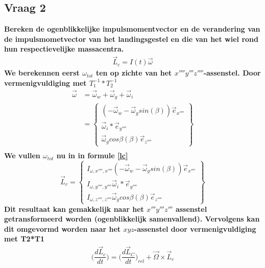 \documentclass[a4paper,10pt]{article}
\begin{document}
\subsection{Vraag 2}
\textbf{Bereken de ogenblikkelijke impulsmomentvector en de verandering van de impulsmometvector van het landingsgestel en die van het wiel rond hun respectievelijke massacentra.}
\begin{equation}
\label{lc}
\begin{aligned}
	\vec{L}_c = I(t)\vec{\omega}
\end{aligned}
\end{equation}
\textbf{We berekennen eerst $\omega_{tot}$ ten op zichte van het $x''''y'''z''''$-assenstel. Door vermenigvuldiging met $T_1^{-1}*T_2^{-1}$}
\begin{equation}
\begin{aligned}
\vec{\omega} &= \vec{\omega}_w + \vec{\omega}_g + \vec{\omega}_i\\
&= \begin{Bmatrix}
(-\vec{\omega}_w -\vec{\omega}_g sin(\beta))\vec{e}_{x''''}\\
\vec{\omega}_i*\vec{e}_{y''''}\\
\vec{\omega}_g cos{\beta}(\beta)\vec{e}_{z''''}
\end{Bmatrix}\\
\end{aligned}
\end{equation}
\textbf{We vullen $\omega_{tot}$ nu in in formule \eqref{lc} }
\begin{equation}
\vec{L}_c=\begin{Bmatrix}
I_{\omega,x'''',x''''} (-\vec{\omega}_w -\vec{\omega}_g sin(\beta))\vec{e}_{x''''}\\
I_{\omega,y'''',y''''}\vec{\omega}_i*\vec{e}_{y''''}\\
I_{\omega,z'''',z''''}\vec{\omega}_g cos{\beta}(\beta)\vec{e}_{z''''}
\end{Bmatrix}
\end{equation}
\textbf{Dit resultaat kan gemakkelijk naar het $x'''y'''z'''$ assenstel getransformeerd worden (ogenblikkelijk samenvallend). Vervolgens kan dit omgevormd worden naar het $xyz$-assenstel door vermenigvuldiging met T2*T1}
\begin{equation}
\begin{aligned}
\Big(\dfrac{d\vec{L}_c}{dt}\Big) = \Big(\dfrac{d\vec{L}_C}{dt}\Big)_{rel} + \vec{\Omega} \times \vec{L}_c
\end{aligned}
\end{equation}
\end{document}
